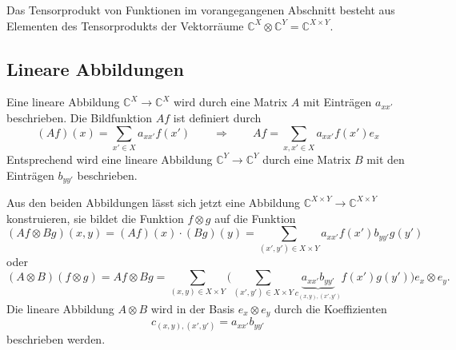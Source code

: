 Das Tensorprodukt von Funktionen im vorangegangenen Abschnitt besteht
aus Elementen des Tensorprodukts der Vektorräume
$\mathbb{C}^X\otimes \mathbb{C}^Y = \mathbb{C}^{X\times Y}$.

%
%
\subsection{Lineare Abbildungen
\label{buch:diskret:tensor:subsection:linabb}}
Eine lineare Abbildung $\mathbb{C}^X\to \mathbb{C}^X$ wird durch eine
Matrix $A$ mit Einträgen $a_{xx'}$ beschrieben.
Die Bildfunktion $Af$ ist definiert durch
\[
(Af)(x) = \sum_{x'\in X}a_{xx'}f(x')
\qquad\Rightarrow\qquad
Af = \sum_{x,x'\in X} a_{xx'}f(x') e_x
\]
Entsprechend wird eine lineare Abbildung $\mathbb{C}^Y\to\mathbb{C}^Y$
durch eine Matrix $B$ mit den Einträgen $b_{yy'}$ beschrieben.

Aus den beiden Abbildungen lässt sich jetzt eine Abbildung 
$\mathbb{C}^{X\times Y} \to \mathbb{C}^{X\times Y}$
konstruieren, sie bildet die Funktion $f\otimes g$ auf die
Funktion
\[
(Af\otimes Bg)(x,y)
=
(Af)(x)\cdot (Bg)(y)
=
\sum_{(x',y')\in X\times Y}
a_{xx'}f(x') b_{yy'}g(y')
\]
oder
\[
(A\otimes B)
(f\otimes g)
=
Af\otimes Bg
=
\sum_{(x,y)\in X\times Y}
\biggl(
\sum_{(x',y')\in X\times Y}
\underbrace{a_{xx'}b_{yy'}}_{\displaystyle c_{(x,y),(x',y')}}
f(x')g(y')
\biggr)
e_x\otimes e_y.
\]
Die lineare Abbildung $A\otimes B$ wird in der Basis $e_x\otimes e_y$
durch die Koeffizienten
\[
c_{(x,y),(x',y')}
=
a_{xx'}b_{yy'}
\]
beschrieben werden.

%
%
